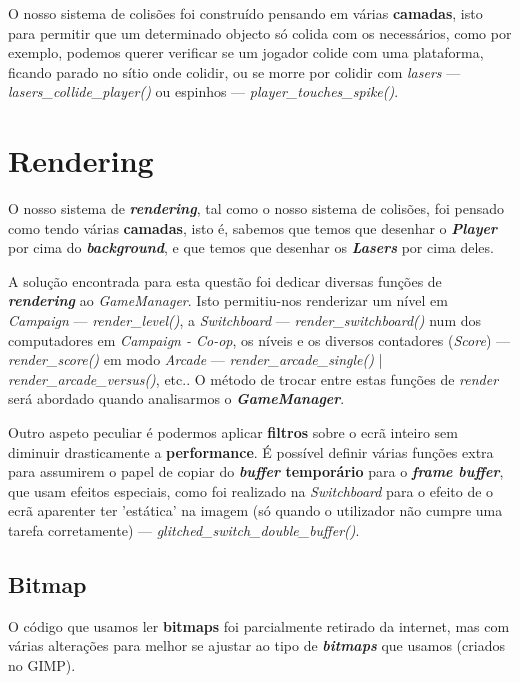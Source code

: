\documentclass{report}
\begin{document}
O nosso sistema de colisões foi construído pensando em várias \textbf{camadas}, isto para permitir que um determinado objecto só colida com os necessários, como por exemplo, podemos querer verificar se um jogador colide com uma plataforma, ficando parado no sítio onde colidir, ou se morre por colidir com \textit{lasers} --- \textit{lasers\_collide\_player()} ou espinhos --- \textit{player\_touches\_spike()}.

\section{Rendering}

O nosso sistema de \textbf{\textit{rendering}}, tal como o nosso sistema de colisões, foi pensado como tendo várias \textbf{camadas}, isto é, sabemos que temos que desenhar o \textbf{\textit{Player}} por cima do \textbf{\textit{background}}, e que temos que desenhar os \textbf{\textit{Lasers}} por cima deles.

A solução encontrada para esta questão foi dedicar diversas funções de \textbf{\textit{rendering}} ao \textit{GameManager}. Isto permitiu-nos renderizar um nível em \textit{Campaign} --- \textit{render\_level()}, a \textit{Switchboard} --- \textit{render\_switchboard()} num dos computadores em \textit{Campaign - Co-op}, os níveis e os diversos contadores (\textit{Score}) --- \textit{render\_score()} em modo \textit{Arcade} --- \textit{render\_arcade\_single()} | \textit{render\_arcade\_versus()}, etc.. O método de trocar entre estas funções de \textit{render} será abordado quando analisarmos o \textbf{\textit{GameManager}}.

Outro aspeto peculiar é podermos aplicar \textbf{filtros} sobre o ecrã inteiro sem diminuir drasticamente a \textbf{performance}. É possível definir várias funções extra para assumirem o papel de copiar do \textbf{\textit{buffer} temporário} para o \textbf{\textit{frame buffer}}, que usam efeitos especiais, como foi realizado na \textit{Switchboard} para o efeito de o ecrã aparenter ter 'estática' na imagem (só quando o utilizador não cumpre uma tarefa corretamente) --- \textit{glitched\_switch\_double\_buffer()}. 

\subsection{Bitmap}

O código que usamos ler \textbf{bitmaps} foi parcialmente retirado da internet, mas com várias alterações para melhor se ajustar ao tipo de \textbf{\textit{bitmaps}} que usamos (criados no GIMP).
\end{document}
